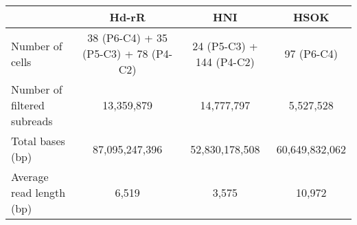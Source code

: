 \begin{tabular}{lccc}
  \hline
  & Hd-rR & HNI & HSOK \\ \hline
  Number of cells & 38 (P6-C4) + 35 (P5-C3) + 78 (P4-C2) & 24 (P5-C3) + 144 (P4-C2)	& 97 (P6-C4) \\
  Number of filtered subreads & 13,359,879	& 14,777,797 & 5,527,528 \\
  Total bases (bp) & 87,095,247,396 & 52,830,178,508 & 60,649,832,062 \\
  Average read length (bp) & 6,519 & 3,575 & 10,972 \\
  \hline
\end{tabular}
